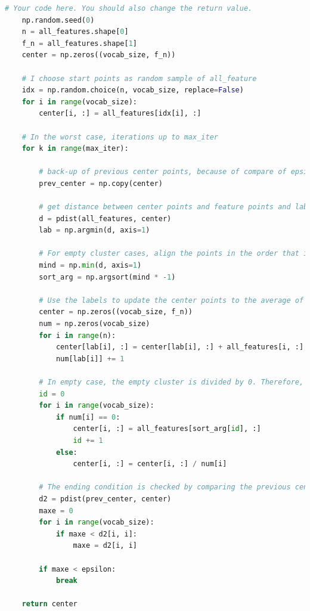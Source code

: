 \lstset{numbers = left, numbersep=5pt, breaklines=true}
\begin{lstlisting}[language=python, caption = {K-means Clustering}]
    # Your code here. You should also change the return value.
    np.random.seed(0)
    n = all_features.shape[0]
    f_n = all_features.shape[1]
    center = np.zeros((vocab_size, f_n))

    # I choose start points as random sample of all_feature
    idx = np.random.choice(n, vocab_size, replace=False)
    for i in range(vocab_size):
        center[i, :] = all_features[idx[i], :]

    # In the worst case, iterations up to max_iter
    for k in range(max_iter):

        # back-up of previous center points, because of compare of epsilon
        prev_center = np.copy(center)

        # get distance between center points and feature points and labeling of feature using np.argmin
        d = pdist(all_features, center)
        lab = np.argmin(d, axis=1)

        # For empty cluster cases, align the points in the order that is farthest from the that point's center
        mind = np.min(d, axis=1)
        sort_arg = np.argsort(mind * -1)

        # Use the labels to update the center points to the average of the points in the cluster.
        center = np.zeros((vocab_size, f_n))
        num = np.zeros(vocab_size)
        for i in range(n):
            center[lab[i], :] = center[lab[i], :] + all_features[i, :]
            num[lab[i]] += 1

        # In empty case, the empty cluster is divided by 0. Therefore, to prevent this, the point that is farthest from the center is adopted as a new center.
        id = 0
        for i in range(vocab_size):
            if num[i] == 0:
                center[i, :] = all_features[sort_arg[id], :]
                id += 1
            else:
                center[i, :] = center[i, :] / num[i]

        # The ending condition is checked by comparing the previous center point with the current point.
        d2 = pdist(prev_center, center)
        maxe = 0
        for i in range(vocab_size):
            if maxe < d2[i, i]:
                maxe = d2[i, i]

        if maxe < epsilon:
            break

    return center
\end{lstlisting}
 
